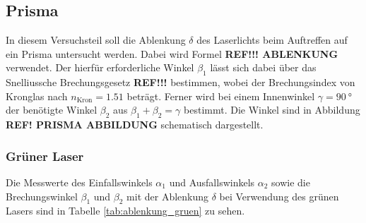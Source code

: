 





\subsection{Prisma}
In diesem Versuchsteil soll die Ablenkung $\delta$ des Laserlichts beim Auftreffen auf ein Prisma untersucht werden.
Dabei wird Formel \textbf{REF!!! ABLENKUNG} verwendet.
Der hierfür erforderliche Winkel $\beta_1$ lässt sich dabei über das Snelliussche Brechungsgesetz \textbf{REF!!!} bestimmen,
wobei der Brechungsindex von Kronglas nach \cite[]{brechungsindex} $n_\text{Kron} = \num[]{1.51}$ beträgt.
Ferner wird bei einem Innenwinkel $\gamma = \qty[]{90}{\degree}$ der benötigte Winkel $\beta_2$ aus $\beta_1 + \beta_2 = \gamma$ bestimmt.
Die Winkel sind in Abbildung \textbf{REF! PRISMA ABBILDUNG} schematisch dargestellt.

\subsubsection{Grüner Laser}
Die Messwerte des Einfallswinkels $\alpha_1$ und Ausfallswinkels $\alpha_2$ sowie
die Brechungswinkel $\beta_1$ und $\beta_2$ mit der Ablenkung $\delta$ bei Verwendung des grünen Lasers sind in Tabelle \ref{tab:ablenkung_gruen} zu sehen.


